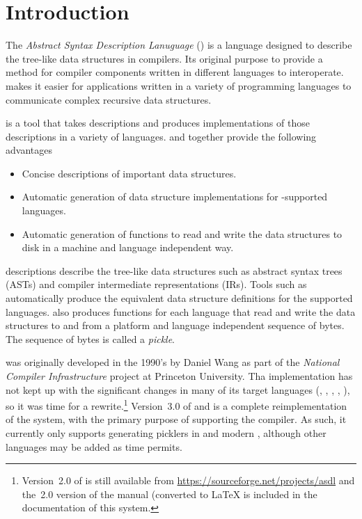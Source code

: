 %
\chapter{Introduction}
\label{chap:introduction}

\thispagestyle{empty}

The \emph{Abstract Syntax Description Lanuguage} (\asdl{}) is a language
designed to describe the tree-like data structures in compilers.
Its original purpose to provide a method for
compiler components written in different languages to
interoperate.
\asdl{} makes it easier for applications written in a
variety of programming languages to communicate complex recursive data
structures. 

\asdlgen{} is a tool that takes \asdl{} descriptions and produces
implementations of those descriptions in a variety of languages.
\asdl{} and \asdlgen{} together provide the following advantages
\begin{itemize}
  \item Concise descriptions of important data structures.
  \item Automatic generation of data structure implementations for
    \asdlgen{}-supported languages.
  \item Automatic generation of functions to read and write the data
    structures to disk in a machine and language independent way.
\end{itemize}%

\asdl{} descriptions describe the tree-like data structures such as
abstract syntax trees (ASTs) and compiler intermediate representations
(IRs).
Tools such as \asdlgen{} automatically produce the equivalent
data structure definitions for the supported languages.
\asdlgen{} also produces functions for each language that read and
write the data structures to and from a platform and language
independent sequence of bytes.
The sequence of bytes is called a \emph{pickle}.

\asdl{} was originally developed in the 1990's by Daniel Wang as part of the
\emph{National Compiler Infrastructure} project at Princeton University.
Tha \asdl{} implementation has not kept up with the significant changes
in many of its target languages (\eg{}, \Cplusplus{}, \haskell{}, \java{},
\etc{}), so it was time for a rewrite.\footnote{
  Version~2.0 of \asdl{} is still available from
  \url{https://sourceforge.net/projects/asdl}
  and the~2.0 version of the manual (converted to \LaTeX{} is included
  in the documentation of this system.
}
Version~3.0 of \asdl{} and \asdlgen{} is a complete reimplementation of the
system, with the primary purpose of supporting the \smlnj{} compiler.
As such, it currently only supports generating picklers in \sml{} and
modern \Cplusplus{}, although other languages may be added as time
permits.

